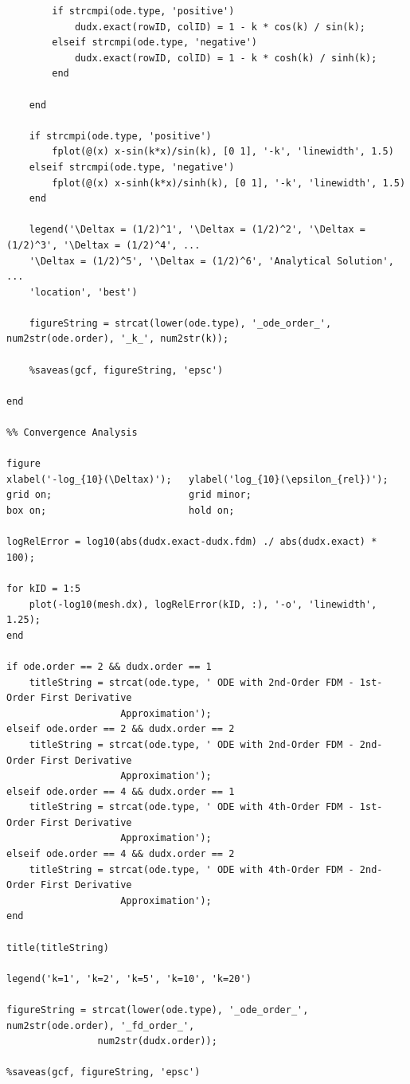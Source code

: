 \documentclass[10pt, reqno]{article}		%
\numberwithin{equation}{section}
\begin{document}
\begin{lstlisting}
		if strcmpi(ode.type, 'positive')
			dudx.exact(rowID, colID) = 1 - k * cos(k) / sin(k);
		elseif strcmpi(ode.type, 'negative')
			dudx.exact(rowID, colID) = 1 - k * cosh(k) / sinh(k);
		end
	
	end
	
	if strcmpi(ode.type, 'positive')
		fplot(@(x) x-sin(k*x)/sin(k), [0 1], '-k', 'linewidth', 1.5)
	elseif strcmpi(ode.type, 'negative')
		fplot(@(x) x-sinh(k*x)/sinh(k), [0 1], '-k', 'linewidth', 1.5)
	end
	
	legend('\Deltax = (1/2)^1', '\Deltax = (1/2)^2', '\Deltax = (1/2)^3', '\Deltax = (1/2)^4', ...
	'\Deltax = (1/2)^5', '\Deltax = (1/2)^6', 'Analytical Solution', ...
	'location', 'best')
	
	figureString = strcat(lower(ode.type), '_ode_order_', num2str(ode.order), '_k_', num2str(k));
	
	%saveas(gcf, figureString, 'epsc')

end

%% Convergence Analysis

figure
xlabel('-log_{10}(\Deltax)');   ylabel('log_{10}(\epsilon_{rel})');
grid on;                        grid minor;
box on;                         hold on;

logRelError = log10(abs(dudx.exact-dudx.fdm) ./ abs(dudx.exact) * 100);

for kID = 1:5
	plot(-log10(mesh.dx), logRelError(kID, :), '-o', 'linewidth', 1.25);
end

if ode.order == 2 && dudx.order == 1
	titleString = strcat(ode.type, ' ODE with 2nd-Order FDM - 1st-Order First Derivative 
					Approximation');
elseif ode.order == 2 && dudx.order == 2
	titleString = strcat(ode.type, ' ODE with 2nd-Order FDM - 2nd-Order First Derivative 
					Approximation');
elseif ode.order == 4 && dudx.order == 1
	titleString = strcat(ode.type, ' ODE with 4th-Order FDM - 1st-Order First Derivative 
					Approximation');
elseif ode.order == 4 && dudx.order == 2
	titleString = strcat(ode.type, ' ODE with 4th-Order FDM - 2nd-Order First Derivative 
					Approximation');
end

title(titleString)

legend('k=1', 'k=2', 'k=5', 'k=10', 'k=20')

figureString = strcat(lower(ode.type), '_ode_order_', num2str(ode.order), '_fd_order_', 
				num2str(dudx.order));

%saveas(gcf, figureString, 'epsc')
\end{lstlisting}
\end{document}
